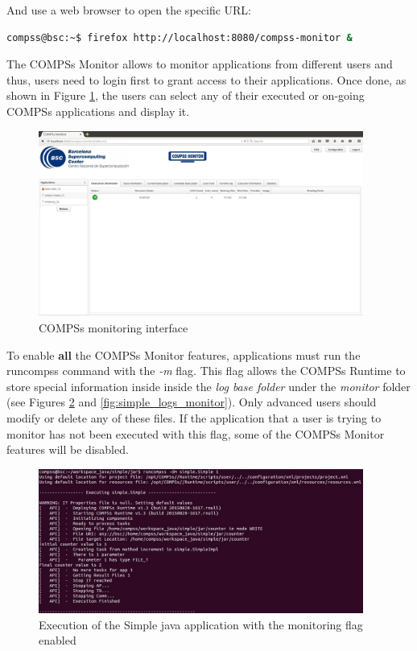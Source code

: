 And use a web browser to open the specific URL:
\begin{lstlisting}[language=bash]
compss@bsc:~$ firefox http://localhost:8080/compss-monitor &
\end{lstlisting}

The COMPSs Monitor allows to monitor applications from different users and thus, users need to login first to grant access 
to their applications. Once done, as shown in Figure \ref{fig:monitoring_interface}, the users can select any of their executed
or on-going COMPSs applications and display it.
\begin{figure}[thb!]
  \centering
    \includegraphics[width=0.95\textwidth]{./Sections/4_Tools/Figures/compss_monitor.jpeg}
    \caption{COMPSs monitoring interface}
    \label{fig:monitoring_interface}
\end{figure}

To enable \textbf{all} the COMPSs Monitor features, applications must run the runcompss command with the \textit{-m} flag. This flag 
allows the  COMPSs Runtime to store special information inside inside the \textit{log base folder} under the \textit{monitor} 
folder (see Figures \ref{fig:simple_exec_monitor} and \ref{fig:simple_logs_monitor}). Only advanced users should modify or delete any of these files. If the application that a user is trying to monitor 
has not been executed with this flag, some of the COMPSs Monitor features will be disabled. 
\begin{figure}[ht!]
  \centering
    \includegraphics[width=0.95\textwidth]{./Sections/4_Tools/Figures/simple_monitor.jpeg}
    \caption{Execution of the Simple java application with the monitoring flag enabled}
    \label{fig:simple_exec_monitor}
\end{figure}

